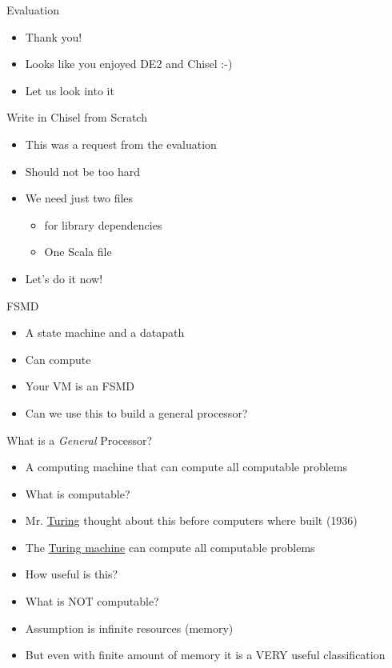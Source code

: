 \begin{frame}[fragile]{Evaluation}
\begin{itemize}
\item Thank you!
\item Looks like you enjoyed DE2 and Chisel :-)
\item Let us look into it
\end{itemize}
\end{frame}

\begin{frame}[fragile]{Write in Chisel from Scratch}
\begin{itemize}
\item This was a request from the evaluation
\item Should not be too hard
\item We need just two files
\begin{itemize}
\item {} for library dependencies
\item One Scala file
\end{itemize}
\item Let's do it now!
\end{itemize}
\end{frame}

\begin{frame}[fragile]{FSMD}
\begin{itemize}
\item A state machine and a datapath
\item Can compute
\item Your VM is an FSMD
\item Can we use this to build a general processor?
\end{itemize}
\end{frame}

\begin{frame}[fragile]{What is a \emph{General} Processor?}
\begin{itemize}
\item A computing machine that can compute all computable problems
\item What is computable?
\item Mr. \href{https://en.wikipedia.org/wiki/Alan_Turing}{Turing} thought about this before computers where built (1936)
\item The \href{https://en.wikipedia.org/wiki/Turing_machine}{Turing machine} can compute all computable problems
\item How useful is this?
\item What is NOT computable?
\item Assumption is infinite resources (memory)
\item But even with finite amount of memory it is a VERY useful classification
\end{itemize}
\end{frame}

